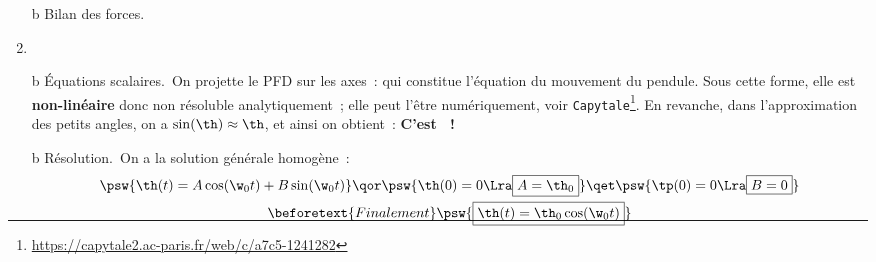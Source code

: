 \documentclass[../../main/main.tex]{subfiles}
\begin{document}
\begin{tcb*}[breakable]
\begin{enumerate}[label=\sqenumi, start=4]
\begin{itemize}
{			            }{%
			            }%
		      \end{itemize}
		\item[b]{Bilan des forces.}
		      \vspace{-25pt}
		\item {}
		\item[b]{Équations scalaires.}~On projette le PFD sur les axes~:
		      \psw{%
			      \[
				      \left\{
				      \begin{array}{rcl}
					      -m\ell\tp^2(t) & = & mg\cos(\th(t)) - T
					      \qMath{\xul{ignorée}}
					      \\
					      m\ell\tpp(t)   & = & -mg\sin(\th(t))
				      \end{array}
				      \right.
				      \quad \Ra \quad
				      \boxed{\tpp(t) + \frac{g}{\ell}\sin(\th(t)) = 0}
			      \]
		      }%
		      qui constitue l'équation du mouvement du pendule. Sous cette forme, elle
		      est \textbf{non-linéaire} donc non résoluble analytiquement~; elle peut
		      l'être numériquement, voir
		      \texttt{Capytale}\footnote{\url{
				      https://capytale2.ac-paris.fr/web/c/a7c5-1241282}}.
		      En revanche, dans l'approximation des petits angles, on a $\sin(\th)\approx\th$,
		      et ainsi on obtient~:
		      \psw{
			      \[
				      \tpp(t) + \frac{g}{\ell}\th(t) = 0
				      \Lra
				      \boxed{\tpp(t) + \w_0{}^2\th(t) = 0}
				      \qav
				      \w_0 = \sqrt{\frac{g}{\ell}}
			      \]
		      }
		      \textbf{C'est ~!}
		\item[b]{Résolution.}~On a la solution générale homogène~:
		      \begin{gather*}
			      \psw{%
				      \th(t) = A\cos(\w_0t) + B\sin(\w_0t)
			      }%
			      \qor
			      \psw{%
				      \th(0) = 0
				      \Lra
				      \boxed{A = \th_0}
			      }%
			      \qet
			      \psw{%
				      \tp(0) = 0
				      \Lra
				      \boxed{B = 0}
			      }%
			      \\\beforetext{Finalement}
			      \psw{%
				      \boxed{\th(t) = \th_0\cos(\w_0t)}
			      }%
			      \vspace{-15pt}
		      \end{gather*}
	\end{enumerate}
\end{tcb*}
\end{document}
